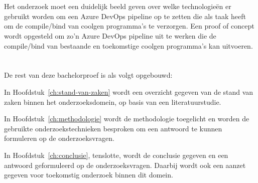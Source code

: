 \section{}%
\label{sec:onderzoeksdoelstelling}

Het onderzoek moet een duidelijk beeld geven over welke technologieën er gebruikt worden om een Azure DevOps pipeline op te zetten die als taak heeft om de compile/bind van coolgen programma's te verzorgen.
Een proof of concept wordt opgesteld om zo'n Azure DevOps pipeline uit te werken die de compile/bind van bestaande en toekomstige coolgen programma's kan uitvoeren. 

\section{}%
\label{sec:opzet-bachelorproef}

De rest van deze bachelorproef is als volgt opgebouwd:

In Hoofdstuk~\ref{ch:stand-van-zaken} wordt een overzicht gegeven van de stand van zaken binnen het onderzoeksdomein, op basis van een literatuurstudie.

In Hoofdstuk~\ref{ch:methodologie} wordt de methodologie toegelicht en worden de gebruikte onderzoekstechnieken besproken om een antwoord te kunnen formuleren op de onderzoeksvragen.


In Hoofdstuk~\ref{ch:conclusie}, tenslotte, wordt de conclusie gegeven en een antwoord geformuleerd op de onderzoeksvragen. Daarbij wordt ook een aanzet gegeven voor toekomstig onderzoek binnen dit domein.